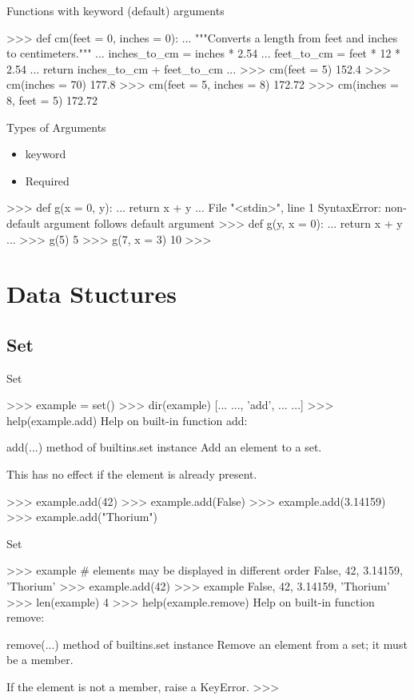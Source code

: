 \documentclass{beamer}
\begin{document}
\begin{frame}[fragile]{Functions with keyword (default) arguments}
\begin{pythoncode}
>>> def cm(feet = 0, inches = 0):
...     """Converts a length from feet and inches to centimeters."""
...     inches_to_cm = inches * 2.54
...     feet_to_cm = feet * 12 * 2.54
...     return inches_to_cm + feet_to_cm
...
>>> cm(feet = 5)
152.4
>>> cm(inches = 70)
177.8
>>> cm(feet = 5, inches = 8)
172.72
>>> cm(inches = 8, feet = 5)
172.72
\end{pythoncode}
\end{frame}

\begin{frame}[fragile]{Types of Arguments}
\begin{itemize}
  \item keyword
  \item Required
\end{itemize}
\begin{pythoncode}
>>> def g(x = 0, y):
...     return x + y
...
  File "<stdin>", line 1
SyntaxError: non-default argument follows default argument
>>> def g(y, x = 0):
...     return x + y
...
>>> g(5)
5
>>> g(7, x = 3)
10
>>>
\end{pythoncode}
\end{frame}

\section{Data Stuctures}
\subsection{Set}

\begin{frame}[fragile]{Set}
\begin{pythoncode}
>>> example = set()
>>> dir(example)
[... ..., 'add', ... ...]
>>> help(example.add)
Help on built-in function add:

add(...) method of builtins.set instance
    Add an element to a set.

    This has no effect if the element is already present.

>>> example.add(42)
>>> example.add(False)
>>> example.add(3.14159)
>>> example.add("Thorium")
\end{pythoncode}
\end{frame}

\begin{frame}[fragile]{Set}
\begin{pythoncode}
>>> example  # elements may be displayed in different order
{False, 42, 3.14159, 'Thorium'}
>>> example.add(42)
>>> example
{False, 42, 3.14159, 'Thorium'}
>>> len(example)
4
>>> help(example.remove)
Help on built-in function remove:

remove(...) method of builtins.set instance
    Remove an element from a set; it must be a member.

    If the element is not a member, raise a KeyError.
>>>
\end{pythoncode}
\end{frame}
\end{document}
